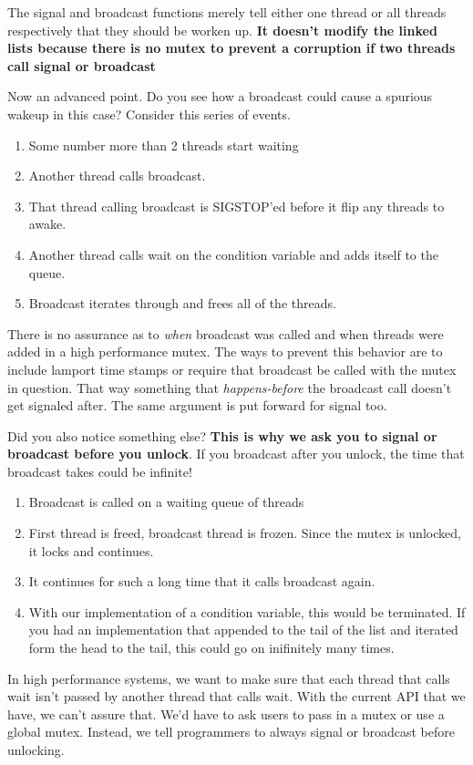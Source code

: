 The signal and broadcast functions merely tell either one thread or all threads respectively that they should be worken up.
\textbf{It doesn't modify the linked lists because there is no mutex to prevent a corruption if two threads call signal or broadcast}

Now an advanced point. Do you see how a broadcast could cause a spurious wakeup in this case? Consider this series of events.

\begin{enumerate}
\item Some number more than 2 threads start waiting
\item Another thread calls broadcast.
\item That thread calling broadcast is SIGSTOP'ed before it flip any threads to awake.
\item Another thread calls wait on the condition variable and adds itself to the queue.
\item Broadcast iterates through and frees all of the threads.
\end{enumerate}

There is no assurance as to \textit{when} broadcast was called and when threads were added in a high performance mutex.
The ways to prevent this behavior are to include lamport time stamps or require that broadcast be called with the mutex in question.
That way something that \textit{happens-before} the broadcast call doesn't get signaled after.
The same argument is put forward for signal too.

Did you also notice something else?
\textbf{This is why we ask you to signal or broadcast before you unlock}.
If you broadcast after you unlock, the time that broadcast takes could be infinite!
\begin{enumerate}
\item Broadcast is called on a waiting queue of threads
\item First thread is freed, broadcast thread is frozen. Since the mutex is unlocked, it locks and continues.
\item It continues for such a long time that it calls broadcast again.
\item With our implementation of a condition variable, this would be terminated. If you had an implementation that appended to the tail of the list and iterated form the head to the tail, this could go on inifinitely many times.
\end{enumerate}

In high performance systems, we want to make sure that each thread that calls wait isn't passed by another thread that calls wait.
With the current API that we have, we can't assure that.
We'd have to ask users to pass in a mutex or use a global mutex.
Instead, we tell programmers to always signal or broadcast before unlocking.

